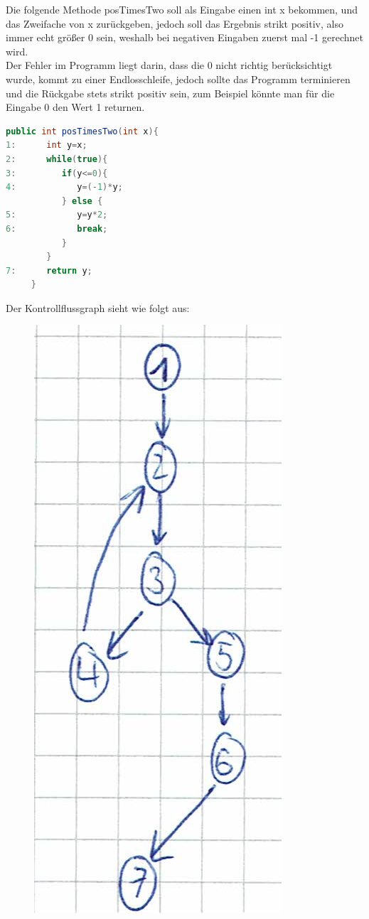 Die folgende Methode posTimesTwo soll als Eingabe einen int x bekommen, und das Zweifache von
x zurückgeben, jedoch soll das Ergebnis strikt positiv, also immer echt größer 0 sein, weshalb 
bei negativen Eingaben zuerst mal -1 gerechnet wird.\\
Der Fehler im Programm liegt darin, dass die 0 nicht richtig berücksichtigt wurde, kommt zu einer Endlosschleife,
jedoch sollte das Programm terminieren und die Rückgabe stets strikt positiv sein, zum Beispiel könnte man für die Eingabe 0 den Wert 1 returnen.
\begin{lstlisting}[language=Java]
     public int posTimesTwo(int x){
1:      int y=x;
2:      while(true){
3:         if(y<=0){
4:            y=(-1)*y;
           } else {
5:            y=y*2;
6:            break;
           }
        }
7:      return y;
     }
\end{lstlisting}
Der Kontrollflussgraph sieht wie folgt aus:\\
\begin{figure}[H]
  \centering
  \includegraphics{3c_cont.jpg}
\end{figure}\ \par
